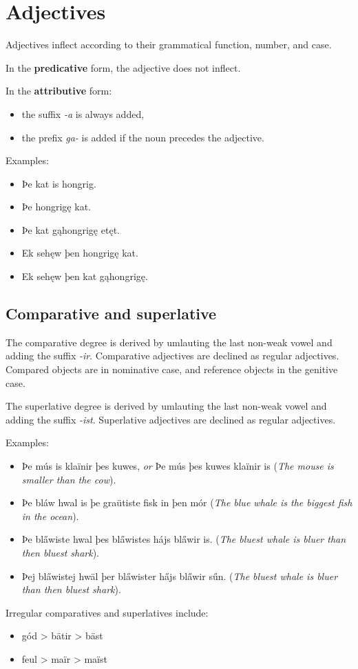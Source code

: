 \section{Adjectives}

Adjectives inflect according to their grammatical function, number, and case.

In the \textbf{predicative} form, the adjective does not inflect.

In the \textbf{attributive} form:

\begin{itemize}
\item the suffix \textit{-a} is always added,
\item the prefix \textit{ga-} is added if the noun precedes the adjective.
\end{itemize}

Examples:

\begin{itemize}
\item Þe kat is hongrig.
\item Þe hongrigę kat.
\item Þe kat gąhongrigę etęt.
\item Ek sehęw þen hongrigę kat.
\item Ek sehęw þen kat gąhongrigę.
\end{itemize}

\subsection{Comparative and superlative}

The comparative degree is derived by umlauting the last non-weak vowel and adding the suffix \textit{-ir}. Comparative adjectives are declined as regular adjectives. Compared objects are in nominative case, and reference objects in the genitive case.

The superlative degree is derived by umlauting the last non-weak vowel and adding the suffix \textit{-ist}. Superlative adjectives are declined as regular adjectives.

Examples:

\begin{itemize}
\item Þe mús is klaïnir þes kuwes, \textit{or} Þe mús þes kuwes klaïnir is (\textit{The mouse is smaller than the cow}).
\item Þe bláw hwal is þe graütiste fisk in þen mór (\textit{The blue whale is the biggest fish in the ocean}).
\item Þe bl\H{a}wiste hwal þes bl\H{a}wistes hájs bl\H{a}wir is. (\textit{The bluest whale is bluer than then bluest shark}).
\item Þej bl\H{a}wistej hwäl þer bl\H{a}wister h\H{a}js bl\H{a}wir sűn. (\textit{The bluest whale is bluer than then bluest shark}).
\end{itemize}

Irregular comparatives and superlatives include:

\begin{itemize}
\item gód > bätir > bäst
\item feul > maïr > maïst
\end{itemize}
